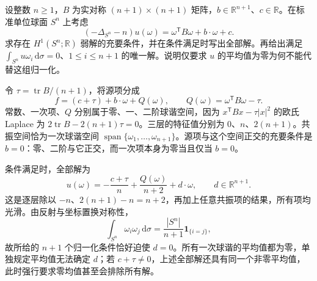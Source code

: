 \begin{exercise}\label{b2:ex:26-spherical-resonance}
设整数 \(n\geq1\)，\(B\) 为实对称 \((n+1)\times(n+1)\) 矩阵，\(b\in\mathbb R^{n+1}\)、\(c\in\mathbb R\)。在标准单位球面 \(S^n\) 上考虑
\[
 (-\Delta_{S^n}-n)u(\omega)=\omega^{\mathsf T}B\omega+b\cdot\omega+c.
\]
求存在 \(H^1(S^n;\mathbb R)\) 弱解的充要条件，并在条件满足时写出全部解。再给出满足 \(\int_{S^n}u\omega_i\,\mathrm d\sigma=0\)、\(1\leq i\leq n+1\) 的唯一解。说明仅要求 \(u\) 的平均值为零为何不能代替这组归一化。
\end{exercise}
\begin{solution}
令 \(\tau=\operatorname{tr}B/(n+1)\)，将源项分成
\[
 f=(c+\tau)+b\cdot\omega+Q(\omega),\qquad
 Q(\omega)=\omega^{\mathsf T}B\omega-\tau.
\]
常数、一次项、\(Q\) 分别属于零、一、二阶球谐空间，因为
\(x^{\mathsf T}Bx-\tau|x|^2\) 的欧氏 Laplace 为
\(2\operatorname{tr}B-2(n+1)\tau=0\)。三层的特征值分别为 \(0\)、\(n\)、\(2(n+1)\)。共振空间恰为一次球谐空间
\(\operatorname{span}\{\omega_1,\ldots,\omega_{n+1}\}\)。源项与这个空间正交的充要条件是 \(b=0\)：零、二阶与它正交，而一次项本身为零当且仅当 \(b=0\)。

条件满足时，全部解为
\[
 u(\omega)=-\frac{c+\tau}{n}+\frac{Q(\omega)}{n+2}+d\cdot\omega,
 \qquad d\in\mathbb R^{n+1}.
\]
这是逐层除以 \(-n\)、\(2(n+1)-n=n+2\)，再加上任意共振项的结果，所有项均光滑。由反射与坐标置换对称性，
\[
 \int_{S^n}\omega_i\omega_j\,\mathrm d\sigma
  =\frac{|S^n|}{n+1}\mathbf1_{\{i=j\}},
\]
故所给的 \(n+1\) 个归一化条件恰好迫使 \(d=0\)。所有一次球谐的平均值都为零，单独规定平均值无法确定 \(d\)；若 \(c+\tau\ne0\)，上述全部解还具有同一个非零平均值，此时强行要求零均值甚至会排除所有解。
\end{solution}


